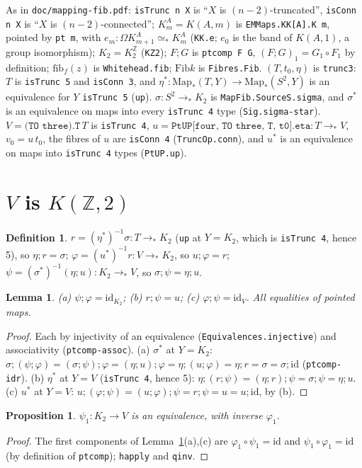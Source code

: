 \documentclass[11pt]{amsart}
\newtheorem{proposition}[theorem]{Proposition}
\newtheorem{lemma}[theorem]{Lemma}
\theoremstyle{definition}
\newtheorem{definition}[theorem]{Definition}
\theoremstyle{remark}
\newcommand{\Om}{\Omega}
\newcommand{\Map}{\mathrm{Map}_*}
\newcommand{\Z}{\mathbb{Z}}
\newcommand{\code}[1]{\texttt{#1}}
\newcommand{\Fib}{\mathrm{Fib}}
\newcommand{\fib}{\mathrm{fib}}
\begin{document}
As in \code{doc/mapping-fib.pdf}: \code{isTrunc n X} is ``$X$ is
$(n-2)$-truncated'', \code{isConn n X} is ``$X$ is $(n-2)$-connected'';
$K^A_m=K(A,m)$ is \code{EMMaps.KK[A].K m}, pointed by \code{pt m}, with
$e_m:\Om K^A_{m+1}\simeq_*K^A_m$ (\code{KK.e}; $e_0$ is the band of
$K(A,1)$, a group isomorphism); $K_2=K^\Z_2$ (\code{KZ2}); $F;G$ is
\code{ptcomp F G}, $(F;G)_1=G_1\circ F_1$ by definition; $\fib_f(z)$ is
\code{Whitehead.fib}; $\Fib k$ is \code{Fibres.Fib}. $(T,t_0,\eta)$ is
\code{trunc3}: $T$ is \code{isTrunc 5} and \code{isConn 3}, and
$\eta^*:\Map(T,Y)\to\Map(S^2,Y)$ is an equivalence for $Y$ \code{isTrunc 5}
(\code{up}). $\sigma:S^2\to_*K_2$ is \code{MapFib.SourceS.sigma}, and
$\sigma^*$ is an equivalence on maps into every \code{isTrunc 4} type
(\code{Sig.sigma-star}). $V=\code{(TO three).T}\,T$ is \code{isTrunc 4},
$u=\code{PtUP[four, TO three, T, t0].eta}:T\to_*V$, $v_0=u\,t_0$, the
fibres of $u$ are \code{isConn 4} (\code{TruncOp.conn}), and $u^*$ is an
equivalence on maps into \code{isTrunc 4} types (\code{PtUP.up}).

\section{$V$ is $K(\Z,2)$}

\begin{definition}\label{d:maps}
$r=(\eta^*)^{-1}\sigma:T\to_*K_2$ (\code{up} at $Y=K_2$, which is
\code{isTrunc 4}, hence 5), so $\eta;r=\sigma$;
$\varphi=(u^*)^{-1}r:V\to_*K_2$, so $u;\varphi=r$;
$\psi=(\sigma^*)^{-1}(\eta;u):K_2\to_*V$, so $\sigma;\psi=\eta;u$.
\end{definition}

\begin{lemma}\label{l:inv}
(a) $\psi;\varphi=\mathrm{id}_{K_2}$; (b) $r;\psi=u$; (c)
$\varphi;\psi=\mathrm{id}_V$. All equalities of pointed maps.
\end{lemma}
\begin{proof}
Each by injectivity of an equivalence (\code{Equivalences.injective}) and
associativity (\code{ptcomp-assoc}).
(a) $\sigma^*$ at $Y=K_2$: $\sigma;(\psi;\varphi)=(\sigma;\psi);\varphi
=(\eta;u);\varphi=\eta;(u;\varphi)=\eta;r=\sigma=\sigma;\mathrm{id}$
(\code{ptcomp-idr}).
(b) $\eta^*$ at $Y=V$ (\code{isTrunc 4}, hence 5):
$\eta;(r;\psi)=(\eta;r);\psi=\sigma;\psi=\eta;u$.
(c) $u^*$ at $Y=V$: $u;(\varphi;\psi)=(u;\varphi);\psi=r;\psi=u=u;\mathrm{id}$, by (b).
\end{proof}

\begin{proposition}\label{p:psi}
$\psi_1:K_2\to V$ is an equivalence, with inverse $\varphi_1$.
\end{proposition}
\begin{proof}
The first components of Lemma~\ref{l:inv}(a),(c) are
$\varphi_1\circ\psi_1=\mathrm{id}$ and $\psi_1\circ\varphi_1=\mathrm{id}$
(by definition of \code{ptcomp}); \code{happly} and \code{qinv}.
\end{proof}
\end{document}
